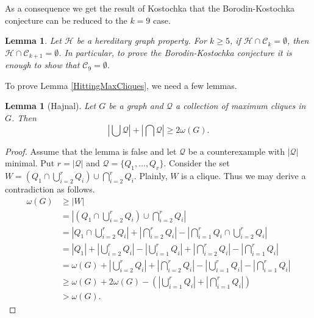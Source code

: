 \documentclass[12pt]{article}
\theoremstyle{plain}
\newtheorem{lem}[thm]{Lemma}
\theoremstyle{definition}
\theoremstyle{remark}
\newcommand{\fancy}[1]{\mathcal{#1}}
\newcommand{\C}[1]{\fancy{C}_{#1}}
\newcommand{\card}[1]{\left|#1\right|}
\begin{document}
As a consequence we get the result of Kostochka that the Borodin-Kostochka conjecture can be reduced to the $k = 9$ case.

\begin{lem}\label{HereditaryReduction}
Let $\fancy{H}$ be a hereditary graph property. For $k \geq 5$, if $\fancy{H} \cap \C{k} = \emptyset$, then $\fancy{H} \cap \C{k+1} = \emptyset$.  In particular, to prove the Borodin-Kostochka conjecture it is enough to show that $\C{9} = \emptyset$.
\end{lem}


To prove Lemma \ref{HittingMaxCliques}, we need a few lemmas.

\begin{lem}[Hajnal]\label{HajnalLemma}
Let $G$ be a graph and $\mathcal{Q}$ a collection of maximum cliques in $G$. Then
\[\card{\bigcup \mathcal{Q}} + \card{\bigcap \mathcal{Q}} \geq 2\omega(G).\]
\end{lem}
\begin{proof}
Assume that the lemma is false and let $\mathcal{Q}$ be a counterexample with $|\mathcal{Q}|$ minimal.  Put $r = \card{\mathcal{Q}}$ and $\mathcal{Q} = \{Q_1, \ldots, Q_r\}$.  Consider the set $W = (Q_1 \cap \bigcup_{i=2}^r Q_i) \cup \bigcap_{i=2}^r Q_i$.  Plainly, $W$ is a clique.  Thus we may derive a contradiction as follows.
\begin{align*}
\omega(G) &\geq |W| \\
&= \card{(Q_1 \cap \bigcup_{i=2}^r Q_i) \cup \bigcap_{i=2}^r Q_i} \\
&= \card{Q_1 \cap \bigcup_{i=2}^r Q_i} + \card{\bigcap_{i=2}^r Q_i} - \card{\bigcap_{i=1}^r Q_i \cap \bigcup_{i=2}^r Q_i} \\
&= \card{Q_1} +\card{\bigcup_{i=2}^r Q_i} - \card{\bigcup_{i=1}^r Q_i} + \card{\bigcap_{i=2}^r Q_i} - \card{\bigcap_{i=1}^r Q_i} \\
&= \omega(G) +\card{\bigcup_{i=2}^r Q_i} + \card{\bigcap_{i=2}^r Q_i} - \card{\bigcup_{i=1}^r Q_i} - \card{\bigcap_{i=1}^r Q_i} \\
&\geq \omega(G) + 2\omega(G) - \left(\card{\bigcup_{i=1}^r Q_i} + \card{\bigcap_{i=1}^r Q_i}\right) \\
& > \omega(G).
\end{align*}
\end{proof}
\end{document}
